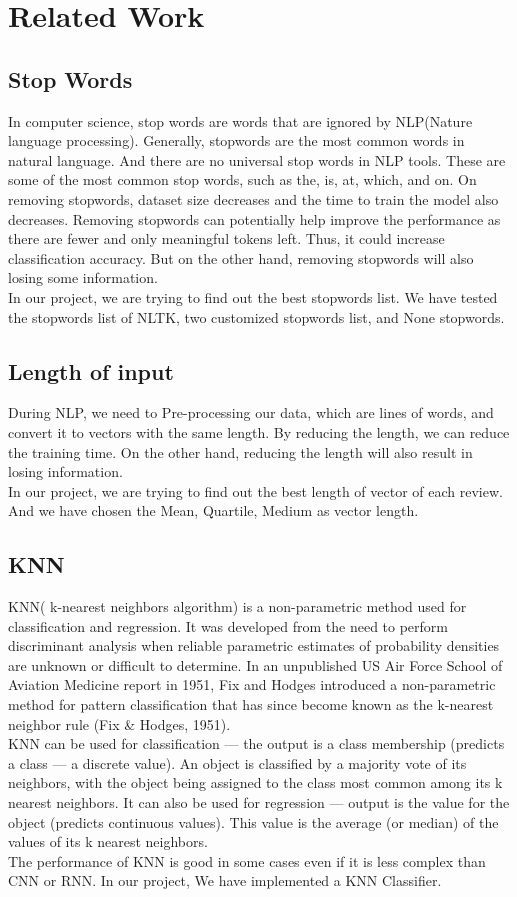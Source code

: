 \documentclass{article}
\begin{document}
\section{Related Work}
\subsection{Stop Words}
In computer science, stop words are words that are ignored by NLP(Nature language processing). Generally,  stopwords are the most common words in natural language. And there are no universal stop words in NLP tools. These are some of the most common stop words, such as the, is, at, which, and on.  On removing stopwords, dataset size decreases and the time to train the model also decreases. Removing stopwords can potentially help improve the performance as there are fewer and only meaningful tokens left. Thus, it could increase classification accuracy. But on the other hand, removing stopwords will also losing some information.\\[2]
In our project,  we are trying to find out the best stopwords list. We have tested the stopwords list of NLTK, two customized stopwords list, and None stopwords. 

\subsection{Length of input}
During NLP, we need to Pre-processing our data, which are lines of words, and convert it to vectors with the same length. By reducing the length, we can reduce the training time. On the other hand, reducing the length will also result in losing information. \\[2]
In our project, we are trying to find out the best length of vector of each review. And we have chosen the Mean,  Quartile, Medium as vector length.
\subsection{KNN}
KNN( k-nearest neighbors algorithm)  is a non-parametric method used for classification and regression. It was developed from the need to perform discriminant analysis when reliable parametric estimates of probability densities are unknown or difficult to determine. In an unpublished US Air Force School of Aviation Medicine report in 1951, Fix and Hodges introduced a non-parametric method for pattern classification that has since become known as the k-nearest neighbor rule (Fix \& Hodges, 1951).\\[2]
KNN can be used for classification — the output is a class membership (predicts a class — a discrete value). An object is classified by a majority vote of its neighbors, with the object being assigned to the class most common among its k nearest neighbors. It can also be used for regression — output is the value for the object (predicts continuous values). This value is the average (or median) of the values of its k nearest neighbors.\\[2]
The performance of KNN is good in some cases even if it is less complex than CNN or RNN. In our project, We have implemented a KNN Classifier.
\end{document}
